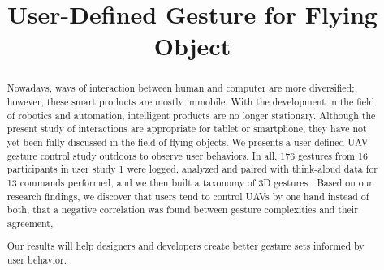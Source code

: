 \documentclass{sigchi}
\begin{document}
\title{User-Defined Gesture for Flying Object}

\maketitle

\begin{abstract}
Nowadays, ways of interaction between human and computer are more diversified; however, these smart products are mostly immobile. With the development in the field of robotics and automation, intelligent products are no longer stationary. Although the present study of interactions are appropriate for tablet or smartphone, they have not yet been fully discussed in the field of flying objects. We presents a user-defined UAV gesture control study outdoors to observe user behaviors. In all, 176 gestures from 16 participants in user study 1 were logged, analyzed and paired with think-aloud data for 13 commands performed, and we then built a taxonomy of 3D gestures . Based on our research findings, we discover that users tend to control UAVs by one hand instead of both, that a negative correlation was found between gesture complexities and their agreement,

Our results will help designers and developers create better gesture sets informed by user behavior.
\end{abstract}
\end{document}
